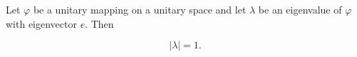 Let $\varphi$ be a unitary mapping on a unitary space and let $\lambda$ be an eigenvalue of $\varphi$ with eigenvector $e$. Then

$$|\lambda| = 1.$$
